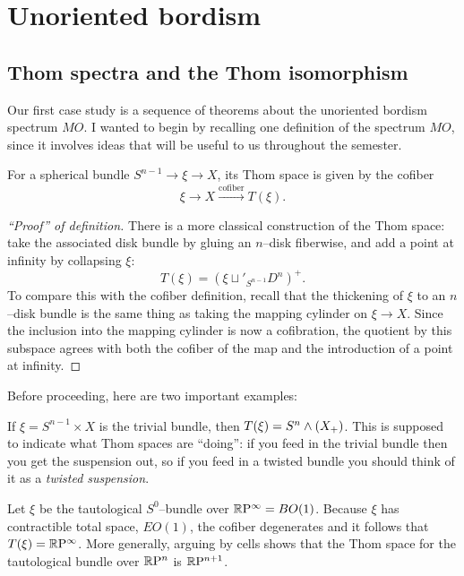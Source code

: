 
\chapter{Unoriented bordism}\label{UnorientedBordismChapter}




\section{Thom spectra and the Thom isomorphism}\label{LectureThomSpectra}

Our first case study is a sequence of theorems about the unoriented bordism spectrum $MO$.  I wanted to begin by recalling one definition of the spectrum $MO$, since it involves ideas that will be useful to us throughout the semester.

\begin{definition}
For a spherical bundle $S^{n-1} \to \xi \to X$, its Thom space is given by the cofiber \[\xi \to X \xrightarrow{\text{cofiber}} T(\xi).\]
\end{definition}
\begin{proof}[``Proof'' of definition]
There is a more classical construction of the Thom space: take the associated disk bundle by gluing an $n$--disk fiberwise, and add a point at infinity by collapsing $\xi$: \[T(\xi) = (\xi \sqcup'_{S^{n-1}} D^n)^+.\]  To compare this with the cofiber definition, recall that the thickening of $\xi$ to an $n$--disk bundle is the same thing as taking the mapping cylinder on $\xi \to X$.  Since the inclusion into the mapping cylinder is now a cofibration, the quotient by this subspace agrees with both the cofiber of the map and the introduction of a point at infinity.
\end{proof}

Before proceeding, here are two important examples:
\begin{example}\label{TrivialBundleThomExample}
If $\xi = S^{n-1} \times X$ is the trivial bundle, then $T(\xi) = S^n \wedge (X_+)$.  This is supposed to indicate what Thom spaces are ``doing'': if you feed in the trivial bundle then you get the suspension out, so if you feed in a twisted bundle you should think of it as a \textit{twisted suspension}.
\end{example}

\begin{example}\label{RPnThomExample}
Let $\xi$ be the tautological $S^0$--bundle over $\mathbb R\mathrm P^\infty = BO(1)$.  Because $\xi$ has contractible total space, $EO(1)$, the cofiber degenerates and it follows that $T(\xi) = \mathbb R\mathrm P^\infty$. More generally, arguing by cells shows that the Thom space for the tautological bundle over $\mathbb R\mathrm P^n$ is $\mathbb R\mathrm P^{n+1}$.
\end{example}

